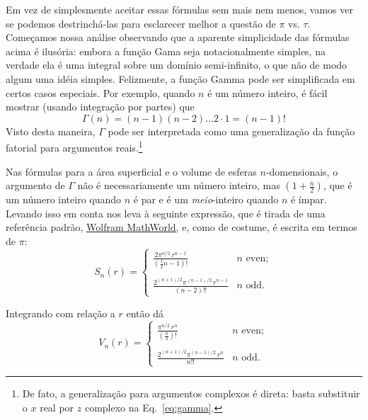 {Em vez de simplesmente aceitar essas fórmulas sem mais nem menos, vamos ver se podemos destrinchá-las para esclarecer melhor a questão de $\pi$ vs. $\tau$. Começamos nossa análise observando que a aparente simplicidade das fórmulas acima é ilusória: embora a função Gama seja notacionalmente simples, na verdade ela é uma integral sobre um domínio semi-infinito, o que não de modo algum uma idéia simples. Felizmente, a função Gamma pode ser simplificada em certos casos especiais. Por exemplo, quando $n$ é um número inteiro, é fácil mostrar (usando integração por partes) que
\[
\Gamma(n) = (n-1)(n-2)\ldots 2\cdot 1 = (n-1)!
\]
Visto desta maneira, $\Gamma$ pode ser interpretada como uma generalização da função fatorial para argumentos reais.\footnote{De fato, a generalização para argumentos complexos é direta: basta substituir o $x$ real por $z$ complexo na Eq.~\eqref{eq:gamma}.} 

Nas fórmulas para a área superficial e o volume de esferas $n$-domensionais, o argumento de $\Gamma$ não é necessariamente um número inteiro, mas $\left(1 + \frac{n}{2}\right)$, que é um número inteiro quando $n$ é par e é um \emph{meio}-inteiro quando $n$ é ímpar. Levando isso em conta nos leva à seguinte expressão, que é tirada de uma referência padrão, \href{https://mathworld.wolfram.com/Hypersphere.html}{Wolfram MathWorld}, e, como de costume, é escrita em termos de $\pi$:
\begin{equation}
\label{eq:surface_area_mathworld}
S_n(r) = \begin{cases}
\displaystyle \frac{2\pi^{n/2}\,r^{n-1}}{(\frac{1}{2}n - 1)!} & n \text{ even}; \\ \\
 \displaystyle \frac{2^{(n+1)/2}\pi^{(n-1)/2}\,r^{n-1}}{(n-2)!!} & n \text{ odd}.
\end{cases}
\end{equation}

Integrando com relação a $r$ então dá
\begin{equation}
\label{eq:volume_mathworld}
V_n(r) = \begin{cases}
\displaystyle \frac{\pi^{n/2}\,r^n}{(\frac{n}{2})!} & n \text{ even}; \\ \\
\displaystyle \frac{2^{(n+1)/2}\pi^{(n-1)/2}\,r^n}{n!!} & n \text{ odd}.
\end{cases}
\end{equation}

}
